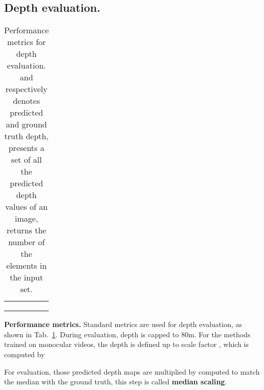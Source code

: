 \documentclass[runningheads]{llncs}
\begin{document}
\subsection{Depth evaluation.}
\begin{table}[!tp]
\begin{center}
\begin{tabular}{ll}
\hline
 
&\\


&\\

\multicolumn{2}{l}{} 
\\
\hline
\end{tabular}
\caption{Performance metrics for depth evaluation.
 and  respectively denotes predicted and ground truth depth,  presents a set of all the predicted depth values of an image,  returns the number of the elements in the input set.
}
\label{tab1}
\end{center}
\end{table}

\textbf{Performance metrics.}
Standard metrics are used for depth evaluation, as shown in Tab.~\ref{tab1}. 
During evaluation, depth is capped to 80m.
For the methods trained on monocular videos, the depth is defined up to scale factor \cite{sfmlearner}, which is computed by

For evaluation, those predicted depth maps are multiplied by computed  to match the median with the ground truth, this step is called \textbf{median scaling}.
\end{document}
